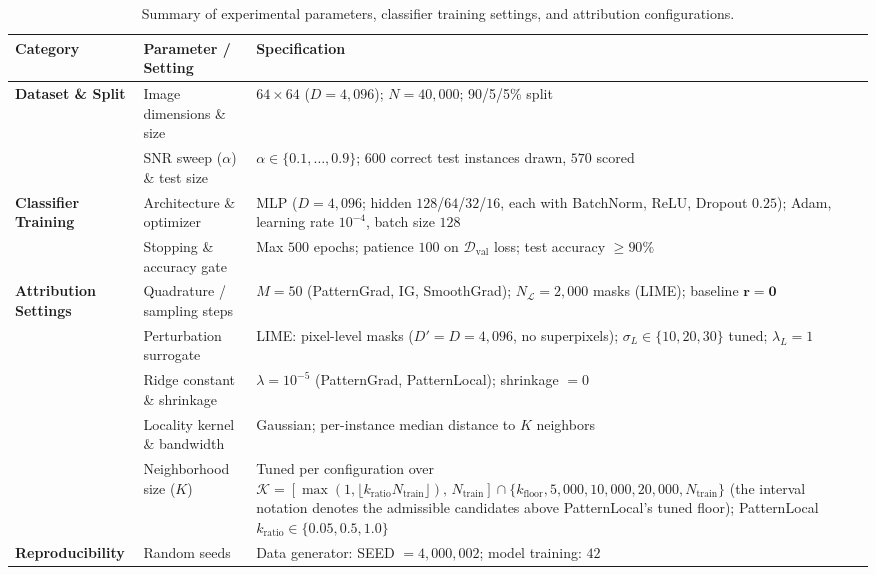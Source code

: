 \documentclass[pdflatex,sn-mathphys-num]{sn-jnl}
\theoremstyle{thmstyleone}
\theoremstyle{thmstyletwo}%
\theoremstyle{thmstylethree}%
\begin{document}
\begin{table}[t]
\centering
\caption{Summary of experimental parameters, classifier training settings, and attribution configurations.}
\label{tab:exp_params}
\footnotesize
\setlength{\tabcolsep}{4pt}
\begin{tabular}{llp{5.6cm}}
\toprule
\textbf{Category} & \textbf{Parameter / Setting} & \textbf{Specification} \\
\midrule
\textbf{Dataset \& Split} 
  & Image dimensions \& size & $64 \times 64$ ($D = 4{,}096$); $N = 40{,}000$; 90/5/5\% split \\
  & SNR sweep ($\alpha$) \& test size & $\alpha \in \{0.1, \dots, 0.9\}$; $600$ correct test instances drawn, $570$ scored \\
\midrule
\textbf{Classifier Training} 
  & Architecture \& optimizer & MLP ($D = 4{,}096$; hidden $128$/$64$/$32$/$16$, each with BatchNorm, ReLU, Dropout $0.25$); Adam, learning rate $10^{-4}$, batch size $128$ \\
  & Stopping \& accuracy gate & Max $500$ epochs; patience $100$ on $\mathcal{D}_{\text{val}}$ loss; test accuracy $\ge 90\%$ \\
\midrule
\textbf{Attribution Settings} 
  & Quadrature / sampling steps & $M = 50$ (PatternGrad, IG, SmoothGrad); $N_{\mathcal{L}} = 2{,}000$ masks (LIME); baseline $\mathbf{r} = \mathbf{0}$ \\
  & Perturbation surrogate & LIME: pixel-level masks ($D' = D = 4{,}096$, no superpixels); $\sigma_L \in \{10, 20, 30\}$ tuned; $\lambda_L = 1$ \\
  & Ridge constant \& shrinkage & $\lambda = 10^{-5}$ (PatternGrad, PatternLocal); shrinkage $= 0$ \\
  & Locality kernel \& bandwidth & Gaussian; per-instance median distance to $K$ neighbors \\
  & Neighborhood size ($K$) & Tuned per configuration over $\mathcal{K} = [\max(1, \lfloor k_{\text{ratio}} N_{\text{train}} \rfloor),\, N_{\text{train}}] \cap \{k_{\text{floor}}, 5{,}000, 10{,}000, 20{,}000, N_{\text{train}}\}$ (the interval notation denotes the admissible candidates above PatternLocal's tuned floor); PatternLocal $k_{\text{ratio}} \in \{0.05, 0.5, 1.0\}$ \\
\midrule
\textbf{Reproducibility} 
  & Random seeds & Data generator: SEED $= 4{,}000{,}002$; model training: $42$ \\
\bottomrule
\end{tabular}
\end{table}
\end{document}
